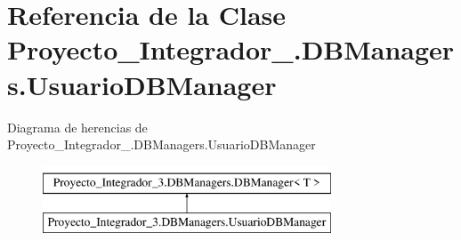 \hypertarget{class_proyecto___integrador__3_1_1_d_b_managers_1_1_usuario_d_b_manager}{\section{Referencia de la Clase Proyecto\-\_\-\-Integrador\-\_.\-D\-B\-Managers.\-Usuario\-D\-B\-Manager}
\label{class_proyecto___integrador__3_1_1_d_b_managers_1_1_usuario_d_b_manager}
}
Diagrama de herencias de Proyecto\-\_\-\-Integrador\-\_.\-D\-B\-Managers.\-Usuario\-D\-B\-Manager\begin{figure}[H]
\begin{center}
\leavevmode
\includegraphics[height=2.000000cm]{class_proyecto___integrador__3_1_1_d_b_managers_1_1_usuario_d_b_manager}
\end{center}
\end{figure}
